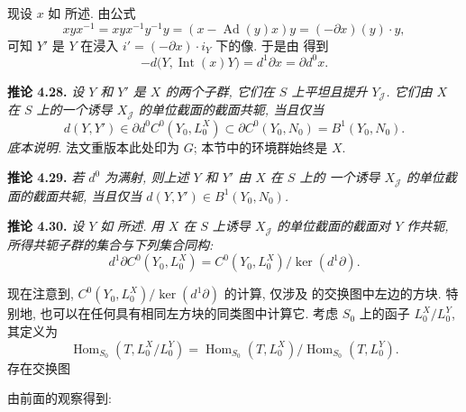 现设 \(x\) 如  所述. 由公式
\[
 xyx^{-1}=xyx^{-1}y^{-1}y
 =(x-\operatorname{Ad}(y)x)y=(-\partial x)(y)\cdot y,
\]
可知 \(Y'\) 是 \(Y\) 在浸入 \(i'=(-\partial x)\cdot i_Y\) 下的像.
于是由  得到
\[
 -d\bigl(Y,\operatorname{Int}(x)Y\bigr)
 =d^1\partial x=\partial d^0x.
\]

\medskip
\noindent{}\textbf{推论 4.28.}
\textit{设 \(Y\) 和 \(Y'\) 是 \(X\) 的两个子群,
它们在 \(S\) 上平坦且提升 \(Y_{\mathscr J}\).
它们由 \(X\) 在 \(S\) 上的一个诱导 \(X_{\mathscr J}\) 的单位截面的截面共轭,
当且仅当}
\[
 d(Y,Y')\in
 \partial d^0 C^0(Y_0,L_0^X)
 \subset \partial C^0(Y_0,N_0)
 =B^1(Y_0,N_0).
\]
\noindent\emph{底本说明.} 法文重版本此处印为 \(G\);
本节中的环境群始终是 \(X\).

\medskip
\noindent{}\textbf{推论 4.29.}
\textit{若 \(d^0\) 为满射, 则上述 \(Y\) 和 \(Y'\) 由 \(X\) 在 \(S\) 上的
一个诱导 \(X_{\mathscr J}\) 的单位截面的截面共轭, 当且仅当
\(d(Y,Y')\in B^1(Y_0,N_0)\).}

\medskip
\noindent{}\textbf{推论 4.30.}
\textit{设 \(Y\) 如  所述.
用 \(X\) 在 \(S\) 上诱导 \(X_{\mathscr J}\) 的单位截面的截面对 \(Y\) 作共轭,
所得共轭子群的集合与下列集合同构:}
\[
 d^1\partial C^0(Y_0,L_0^X)
 =C^0(Y_0,L_0^X)\big/\ker(d^1\partial).
\]

现在注意到, \(C^0(Y_0,L_0^X)/\ker(d^1\partial)\) 的计算,
仅涉及  的交换图中左边的方块.
特别地, 也可以在任何具有相同左方块的同类图中计算它.
考虑 \(S_0\) 上的函子 \(L_0^X/L_0^Y\), 其定义为
\[
 \operatorname{Hom}_{S_0}(T,L_0^X/L_0^Y)
 =\operatorname{Hom}_{S_0}(T,L_0^X)
  \big/\operatorname{Hom}_{S_0}(T,L_0^Y).
\]
存在交换图

\begin{center}
\end{center}

由前面的观察得到:

